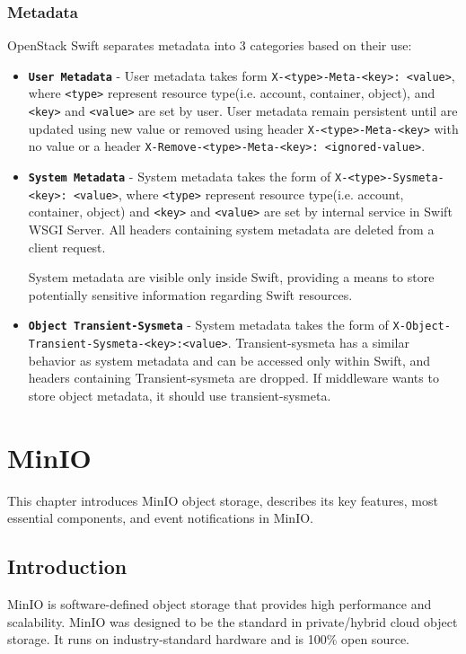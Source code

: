     \subsection{Metadata}
    OpenStack Swift separates metadata into 3 categories based on their use:
    \begin{itemize}
        \item \textbf{\texttt{User Metadata}} - User metadata takes form \texttt{X-<type>-Meta-<key>: <value>}, where \texttt{<type>} represent resource type(i.e. account, container, object), and \texttt{<key>} and \texttt{<value>} are set by user. User metadata remain persistent until are updated using new value or removed using header \texttt{X-<type>-Meta-<key>} with no value or a header \texttt{X-Remove-<type>-Meta-<key>: <ignored-value>}.
        \item \textbf{\texttt{System Metadata}} - System metadata takes the form of \texttt{X-<type>-Sysmeta-<key>: <value>}, where \texttt{<type>} represent resource type(i.e. account, container, object) and \texttt{<key>} and \texttt{<value>} are set by internal service in Swift WSGI Server.
        All headers containing system metadata are deleted from a client request.

        System metadata are visible only inside Swift, providing a means to store potentially sensitive information regarding Swift resources.
        \item \textbf{\texttt{Object Transient-Sysmeta}} - System metadata takes the form of \texttt{\newline X-Object-Transient-Sysmeta-<key>:<value>}. Transient-sysmeta has a similar behavior as system metadata and can be accessed only within Swift, and headers containing Transient-sysmeta are dropped. If middleware wants to store object metadata, it should use transient-sysmeta\cite{swiftMiddleware}.
    \end{itemize}

\chapter{MinIO}\label{chap:minio}
This chapter introduces MinIO object storage, describes its key features, most essential components, and event notifications in MinIO.

\section{Introduction}
    MinIO is software-defined object storage that provides high performance and scalability. MinIO was designed to be the standard in private/hybrid cloud object storage.
    It runs on industry-standard hardware and is 100\% open source\cite{minioObjectStorage}.

